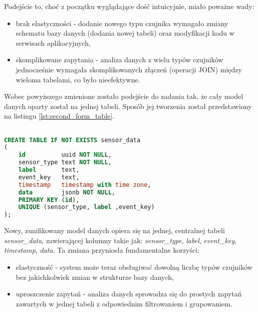 Podejście to, choć z początku wyglądające dość intuicyjnie, miało poważne wady:

\vspace{0.3em}

\begin{itemize}
    \item brak elastyczności - dodanie nowego typu czujnika wymagało zmiany schematu bazy danych (dodania nowej tabeli) oraz modyfikacji kodu w serwisach aplikacyjnych,
    \item skomplikowane zapytania - analiza danych z wielu typów czujników jednocześnie wymagała skomplikowanych złączeń (operacji JOIN) \cite{kleppmann2017designing} między wieloma tabelami, co było nieefektywne.
\end{itemize}

\vspace{0.3em}

Wobec powyższego zmienione zostało podejście do zadania tak, że cały model danych oparty został na jednej tabeli. Sposób jej tworzenia został przedstawiony na listingu \ref{lst:second_form_table}.

\vspace{0.3em}


\begin{lstlisting}[caption=Druga forma tabeli w relacyjnej bazie danych, label={lst:second_form_table},language=SQL]

CREATE TABLE IF NOT EXISTS sensor_data
(
    id          uuid NOT NULL,
    sensor_type text NOT NULL,
    label       text,
    event_key   text,
    timestamp   timestamp with time zone,
    data        jsonb NOT NULL,
    PRIMARY KEY (id),
    UNIQUE (sensor_type, label ,event_key)
);
\end{lstlisting}


Nowy, zunifikowany model danych opiera się na jednej, centralnej tabeli \textit{sensor\_data}, zawierającej kolumny takie jak: \textit{sensor\_type}, \textit{label}, \textit{event\_key}, \textit{timestamp}, \textit{data}. Ta zmiana przyniosła fundamentalne korzyści:

\vspace{0.3em}

\begin{itemize}
    \item elastyczność - system może teraz obsługiwać dowolną liczbę typów czujników bez jakichkolwiek zmian w strukturze bazy danych,
    \item uproszczenie zapytań - analiza danych sprowadza się do prostych zapytań zawartych w jednej tabeli z odpowiednim filtrowaniem i grupowaniem.
\end{itemize}

